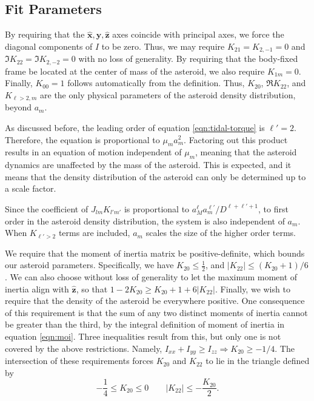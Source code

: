 \documentclass{aastex631}
\newcommand{\unit}[1]{\hat{\bm{#1}}}
\begin{document}
\subsection{Fit Parameters}
By requiring that the $\unit x, \unit y, \unit z$ axes coincide with principal axes, we force the diagonal components of $I$ to be zero. Thus, we may require $K_{21}=K_{2,-1}=0$ and $\Im K_{22}=\Im K_{2,-2}=0$ with no loss of generality. By requiring that the body-fixed frame be located at the center of mass of the asteroid, we also require $K_{1m}=0$. Finally, $K_{00}=1$ follows automatically from the definition. Thus, $K_{20}$, $\Re K_{22}$, and $K_{\ell>2, m}$ are the only physical parameters of the asteroid density distribution, beyond $a_m$.

As discussed before, the leading order of equation \ref{eqn:tidal-torque} is $\ell' = 2$. Therefore, the equation is proportional to $\mu_m a_m^2$. Factoring out this product results in an equation of motion independent of $\mu_m$, meaning that the asteroid dynamics are unaffected by the mass of the asteroid. This is expected, and it means that the density distribution of the asteroid can only be determined up to a scale factor.

Since the coefficient of $J_{lm}K_{l'm'}$ is proportional to $a_M^\ell a_m^{\ell'} / D^{\ell+\ell'+1}$, to first order in the asteroid density distribution, the system is also independent of $a_m$. When $K_{\ell' > 2}$ terms are included, $a_m$ scales the size of the higher order terms.

We require that the moment of inertia matrix be positive-definite, which bounds our asteroid parameters. Specifically, we have $K_{20} \leq \frac{1}{2}$, and $|K_{22}| \leq (K_{20}+1)/6$. We can also choose without loss of generality to let the maximum moment of inertia align with $\unit z$, so that $1-2K_{20}\geq K_{20}+1+6|K_{22}|.$ Finally, we wish to require that the density of the asteroid be everywhere positive. One consequence of this requirement is that the sum of any two distinct moments of inertia cannot be greater than the third, by the integral definition of moment of inertia in equation \ref{eqn:moi}. Three inequalities result from this, but only one is not covered by the above restrictions. Namely, $I_{xx} + I_{yy}\geq I_{zz} \Rightarrow K_{20} \geq -1/4$. The intersection of these requirements forces $K_{20}$ and $K_{22}$ to lie in the triangle defined by
\begin{equation}
-\frac{1}{4} \leq K_{20} \leq 0 \qquad |K_{22}| \leq -\frac{K_{20}}{2}.
\label{eqn:parameter-bounds}
\end{equation}
\end{document}
